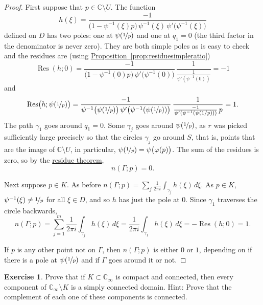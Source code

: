 \documentclass[12pt,openany]{book}
\newcommand{\C}{{\mathbb{C}}}
\theoremstyle{plain}
\theoremstyle{remark}
\theoremstyle{definition}
\newenvironment{exbox}{%
    \def\FrameCommand{\vrule width 1pt \relax\hspace{10pt}}%
    \MakeFramed{\advance\hsize-\width\FrameRestore}%
}{%
    \endMakeFramed
}
\theoremstyle{exercise}
\newtheorem{exercise}{Exercise}[section]
\theoremstyle{example}
\newcommand{\propref}[1]{\hyperref[#1]{Proposition~\ref*{#1}}}
\begin{document}
\begin{proof}
First suppose that $p \in \C \setminus U$.
The function 
\begin{equation*}
h(\xi) =
\frac{-1}{ \bigl( 1-\psi^{-1}(\xi)p \bigr)
\,
\psi^{-1}(\xi)
\,
\psi' \bigl(\psi^{-1}(\xi)\bigr)}
\end{equation*}
defined on $D$ has two poles: one at $\psi(\nicefrac{1}{p})$ and one
at $q_1=0$ (the third factor in the denominator is never zero).
They are both simple poles as is easy to check and the residues are (using
\propref{prop:residuesimpleratio})
\begin{equation*}
\operatorname{Res}(h;0) = 
\frac{-1}{ \bigl( 1-\psi^{-1}(0)p \bigr)
\,
\psi' \bigl(\psi^{-1}(0)\bigr)}
\,
\frac{1}{\frac{1}{\psi'(\psi^{-1}(0))}}
=
-1
\end{equation*}
and
\begin{equation*}
\operatorname{Res}\bigl(h;\psi(\nicefrac{1}{p})\bigr)
=
\frac{-1}{
\psi^{-1}\bigl(\psi(\nicefrac{1}{p})\bigr)
\,
\psi' \bigl(\psi^{-1}(\psi(\nicefrac{1}{p}))\bigr)
}
\,
\frac{1}{
\frac{-1}{\psi'(\psi^{-1}(\psi(1/p)))}
\, p
}
=
1 .
\end{equation*}
The path $\gamma_1$ goes around $q_1=0$.
Some $\gamma_j$ goes around
$\psi(\nicefrac{1}{p})$, as $r$ was picked sufficiently large
precisely so that the circles $\gamma_j$ go around $S$, that is, points that
are the image of $\C \setminus U$,
in particular, $\psi(\nicefrac{1}{p})=\psi\bigl(\varphi(p)\bigr)$.
The sum of the residues is zero, so 
by the \hyperref[thm:residue]{residue theorem},
\begin{equation*}
n(\Gamma;p) = 0 .
\end{equation*}

Next suppose $p \in K$.  As before
$n(\Gamma;p) = 
\sum_j
\frac{1}{2\pi i}
\int_{\gamma_j} h(\xi) \, d\xi$.
As $p \in K$, $\psi^{-1}(\xi) \not= \nicefrac{1}{p}$ for all $\xi \in D$,
and so $h$ has just the pole at $0$.
Since $\gamma_1$ traverses the circle backwards,
\begin{equation*}
n(\Gamma;p) = 
\sum_{j=1}^m
\frac{1}{2\pi i}
\int_{\gamma_j} h(\xi) \, d\xi 
=
\frac{1}{2\pi i}
\int_{\gamma_1} h(\xi) \, d\xi 
= - \operatorname{Res}(h;0) = 1 .
\end{equation*}

If $p$ is any other point not on $\Gamma$, then $n(\Gamma;p)$
is either $0$ or $1$, depending on if there is a pole at
$\psi(\nicefrac{1}{p})$ and if $\Gamma$ goes around it or not.
\end{proof}

\begin{exbox}
\begin{exercise}
Prove that if $K \subset \C_\infty$ is compact and connected, then 
every component of $\C_\infty \setminus K$ is a simply connected domain.
Hint: Prove that the complement of each one of these components is connected.
\end{exercise}
\end{exbox}
\end{document}
